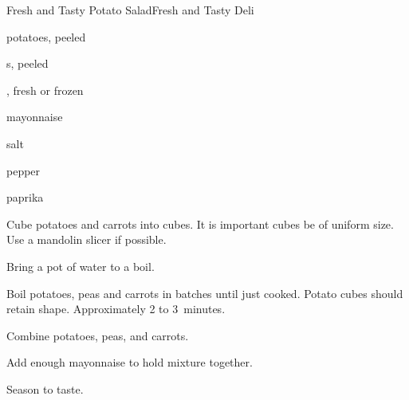 \begin{recipe}{Fresh and Tasty Potato Salad}{Fresh and Tasty Deli}{}

\begin{ingredients}
\item potatoes, peeled
\item {}s, peeled
\item {}, fresh or frozen
\item mayonnaise
\item salt
\item pepper
\item paprika
\end{ingredients}

\begin{directions}
\item Cube potatoes and carrots into \inch{\half} cubes. It is important cubes be of uniform size. Use a mandolin slicer if possible.
\item Bring a pot of water to a boil.
\item Boil potatoes, peas and carrots in batches until just cooked. Potato cubes should retain shape. Approximately 2 to 3~minutes.
\item Combine potatoes, peas, and carrots.
\item Add enough mayonnaise to hold mixture together.
\item Season to taste.
\end{directions}

\end{recipe}
